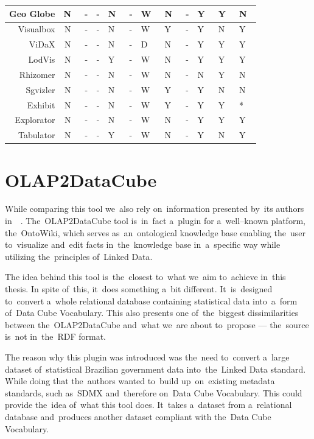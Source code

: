 \begin{table}[h]
\begin{tabularx}{\textwidth}{ |r|C|C|C|X|X|X|X|X|X|X|X| }
  Geo Globe             & N~& - & - & N~& - & W~& N~& - & Y~& Y~& N~\\ \hline
  Visualbox              & N~& - & - & N~& - & W~& Y~& - & Y~& N~& Y~\\ \hline
  ViDaX                    & N~& - & - & N~& - & D~& N~& - & Y~& Y~& Y~\\ \hline
  LodVis                   & N~& - & - & Y~& - & W~& N~& - & Y~& Y~& Y~\\ \hline
  Rhizomer              & N~& - & - & N~& - & W~& N~& - & N~& Y~& N~\\ \hline
  Sgvizler                 & N~& - & - & N~& - & W~& Y~& - & Y~& N~& N~\\ \hline
  Exhibit                  & N~& - & - & N~& - & W~& Y~& - & Y~& Y~& * \\ \hline
  Explorator             & N~& - & - & N~& - & W~& N~& - & Y~& Y~& Y~\\ \hline
  Tabulator              & N~& - & - & Y~& - & W~& N~& - & Y~& N~& Y~\\ \hline
\end{tabularx}
\end{table}

\section{OLAP2DataCube}
\label{olap2dc}
\label{rw:olap2dc}
While comparing this tool we~also rely on~information presented by~its authors in~~\cite{olap2dc-paper}. The~OLAP2DataCube tool is~in~fact a~plugin for a~well--known 
platform, the~OntoWiki, which serves as~an~ontological knowledge base enabling
the~user to~visualize and~edit facts in~the~knowledge base in~a~specific way
while utilizing the~principles of~Linked Data.

The idea behind this tool is~the~closest to~what we~aim to~achieve in~this thesis.
In spite of~this, it~does something a~bit different. It~is~designed to~convert a~whole relational database containing statistical data into~a~form of~Data Cube 
Vocabulary. This also presents one of~the~biggest dissimilarities between the~OLAP2DataCube and~what we~are about to~propose --- the~source is~not in~the~RDF format.

The reason why this plugin was introduced was the~need to~convert a~large 
dataset of~statistical Brazilian government data into~the~Linked Data standard.
While doing that the~authors wanted to~build up~on~existing metadata standards, 
such as~SDMX and~therefore on~Data Cube Vocabulary. This could provide the~idea of~what this tool does. It~takes a~dataset from a~relational database and~produces 
another dataset compliant with the~Data Cube Vocabulary.

